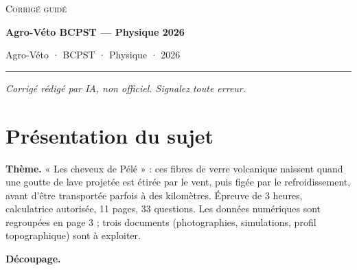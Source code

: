 \documentclass[11pt,a4paper]{article}
\begin{document}
\thispagestyle{plain}
\begin{center}
  {\small\scshape Corrigé guidé}\par\smallskip
  {\LARGE\bfseries Agro-Véto BCPST — Physique 2026\par}\medskip
  {\large Agro-Véto · BCPST · Physique · 2026\par}
\end{center}
\vspace{2pt}\hrule\vspace{8pt}

\emph{Corrigé rédigé par IA, non officiel. Signalez toute erreur.}

\hypertarget{pruxe9sentation-du-sujet}{%
\section{Présentation du sujet}\label{pruxe9sentation-du-sujet}}

\textbf{Thème.} « Les cheveux de Pélé » : ces fibres de verre volcanique naissent quand une goutte de lave projetée est étirée par le vent, puis figée par le refroidissement, avant d'être transportée parfois à des kilomètres. Épreuve de 3 heures, calculatrice autorisée, 11 pages, 33 questions. Les données numériques sont regroupées en page 3 ; trois documents (photographies, simulations, profil topographique) sont à exploiter.

\textbf{Découpage.}
\end{document}
